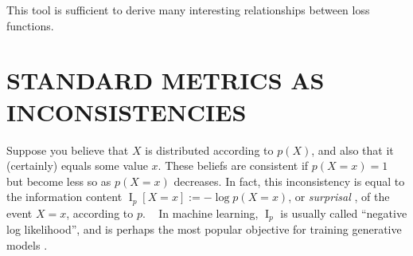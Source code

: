 \documentclass[twoside]{article}
\theoremstyle{plain}
\theoremstyle{definition}
\DeclareMathOperator{\I}{\mathrm{I}} %
\newcommand{\mat}[1]{\mathbf{#1}}
\begin{document}
This tool is sufficient to derive many interesting relationships between loss functions.
\section{STANDARD METRICS AS INCONSISTENCIES}

\def\xsamp{{\mathcal D}}
\def\xysamp{{\mathcal D}}

Suppose you believe that $X$ is distributed according to $p(X)$,
and also that it (certainly) equals some value $x$. These beliefs are consistent if $p(X\!\!=\!x) =\! 1$ 
but become less so
 as $p(X\!\!=\!x)$ decreases.
In fact, this inconsistency
is equal to
the
information content  $\I_p[X\!\!=\!x] := -\log p(X\!\!=\!x)$, or \emph{surprisal} \parencite{tribus1961information}, of the event $X \!\!=\! x$,
according to $p$.%
\footnotemark\
In machine learning, $\I_p$ is usually called ``negative log
likelihood'', and is perhaps the most popular objective for training
generative models
\parencite{deepgennotes,myung2003tutorial}.%
\end{document}
